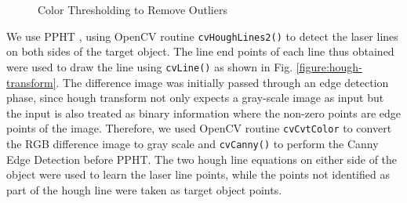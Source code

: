 \begin{figure}[ht!]
\centering
{} \quad
{} \hfill
\caption{Color Thresholding to Remove Outliers}
\label{figure:color-thres}
\end{figure}

We use \ac{PPHT} \cite{kiryati:1991}, \cite{matas:2000} using OpenCV routine
\texttt{cvHoughLines2()} to detect the laser lines on both sides of the target
object. The line end points of each line thus obtained were used to draw the
line using \texttt{cvLine()} as shown in Fig. \ref{figure:hough-transform}.
The difference image was initially passed through an edge detection phase,
since hough transform not only expects a gray-scale image as input but the
input is also treated as binary information where the non-zero points are edge
points of the image. Therefore, we used OpenCV routine \texttt{cvCvtColor} to
convert the RGB difference image to gray scale and \texttt{cvCanny()} to
perform the Canny Edge Detection \cite{canny:1986} before \ac{PPHT}. The two
hough line equations on either side of the object were used to learn the laser
line points, while the points not identified as part of the hough line were
taken as target object points.

